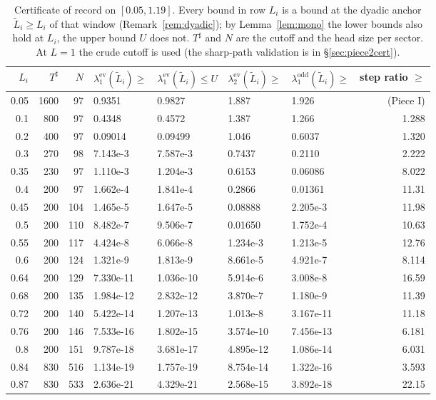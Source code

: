 \documentclass[11pt]{amsart}
\newcommand{\ev}{\mathrm{ev}}
\newcommand{\od}{\mathrm{odd}}
\newcommand{\Tsh}{T^{\sharp}}
\theoremstyle{definition}
\theoremstyle{remark}
\numberwithin{equation}{section}
\begin{document}
\begin{table}[ht]
\centering\footnotesize
\caption{Certificate of record on $[0.05,1.19]$. Every bound in row $L_i$ is a bound at the dyadic anchor $\tilde L_i\ge L_i$ of that window (Remark~\ref{rem:dyadic}); by Lemma~\ref{lem:mono} the lower bounds also hold at $L_i$, the upper bound $U$ does not. $\Tsh$ and $N$ are the cutoff and the head size per sector. At $L=1$ the crude cutoff is used (the sharp-path validation is in \S\ref{sec:piece2cert}).}\label{tab:piece2}
\begin{tabular}{rrrllllr}
\toprule
$L_i$ & $\Tsh$ & $N$ & $\lambda_1^\ev(\tilde L_i)\ge$ & $\lambda_1^\ev(\tilde L_i)\le U$ & $\lambda_2^\ev(\tilde L_i)\ge$ & $\lambda_1^\od(\tilde L_i)\ge$ & step ratio $\ge$\\
\midrule
0.05 & 1600 & 97 & 0.9351 & 0.9827 & 1.887 & 1.926 & (Piece I)\\
0.1 & 800 & 97 & 0.4348 & 0.4572 & 1.387 & 1.266 & 1.288\\
0.2 & 400 & 97 & 0.09014 & 0.09499 & 1.046 & 0.6037 & 1.320\\
0.3 & 270 & 98 & 7.143e-3 & 7.587e-3 & 0.7437 & 0.2110 & 2.222\\
0.35 & 230 & 97 & 1.110e-3 & 1.204e-3 & 0.6153 & 0.06086 & 8.022\\
0.4 & 200 & 97 & 1.662e-4 & 1.841e-4 & 0.2866 & 0.01361 & 11.31\\
0.45 & 200 & 104 & 1.465e-5 & 1.647e-5 & 0.08888 & 2.205e-3 & 11.98\\
0.5 & 200 & 110 & 8.482e-7 & 9.506e-7 & 0.01650 & 1.752e-4 & 10.63\\
0.55 & 200 & 117 & 4.424e-8 & 6.066e-8 & 1.234e-3 & 1.213e-5 & 12.76\\
0.6 & 200 & 124 & 1.321e-9 & 1.813e-9 & 8.661e-5 & 4.921e-7 & 8.114\\
0.64 & 200 & 129 & 7.330e-11 & 1.036e-10 & 5.914e-6 & 3.008e-8 & 16.59\\
0.68 & 200 & 135 & 1.984e-12 & 2.832e-12 & 3.870e-7 & 1.180e-9 & 11.39\\
0.72 & 200 & 140 & 5.422e-14 & 1.207e-13 & 1.013e-8 & 3.167e-11 & 11.18\\
0.76 & 200 & 146 & 7.533e-16 & 1.802e-15 & 3.574e-10 & 7.456e-13 & 6.181\\
0.8 & 200 & 151 & 9.787e-18 & 3.681e-17 & 4.895e-12 & 1.086e-14 & 6.031\\
0.84 & 830 & 516 & 1.134e-19 & 1.757e-19 & 8.754e-14 & 1.322e-16 & 3.593\\
0.87 & 830 & 533 & 2.636e-21 & 4.329e-21 & 2.568e-15 & 3.892e-18 & 22.15\\

\end{tabular}
\end{table}
\end{document}
